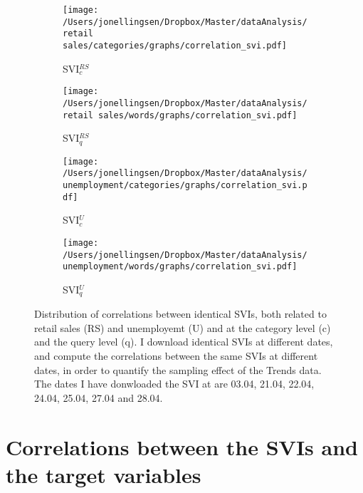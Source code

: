\begin{figure}[H]
\centering
    \begin{subfigure}[b]{0.45\textwidth}
\caption{SVI$_c^{RS}$}
        \texttt{[image: /Users/jonellingsen/Dropbox/Master/dataAnalysis/retail sales/categories/graphs/correlation\_svi.pdf]}
    \end{subfigure}
    \begin{subfigure}[b]{0.45\textwidth}
\caption{SVI$_q^{RS}$}
        \texttt{[image: /Users/jonellingsen/Dropbox/Master/dataAnalysis/retail sales/words/graphs/correlation\_svi.pdf]}
    \end{subfigure}
\begin{subfigure}[b]{0.45\textwidth}
 \caption{SVI$_c^U$}        
\texttt{[image: /Users/jonellingsen/Dropbox/Master/dataAnalysis/unemployment/categories/graphs/correlation\_svi.pdf]}
    \end{subfigure}
\begin{subfigure}[b]{0.45\textwidth}
\caption{SVI$_q^U$}        
\texttt{[image: /Users/jonellingsen/Dropbox/Master/dataAnalysis/unemployment/words/graphs/correlation\_svi.pdf]}
    \end{subfigure}
    \caption{Distribution of correlations between identical SVIs, both related to retail sales (RS) and unemployemt (U) and at the category level (c) and the query level (q). I download identical SVIs at different dates, and compute the correlations between the same SVIs at different dates, in order to quantify the sampling effect of the Trends data. The dates I have donwloaded the SVI at are 03.04, 21.04, 22.04, 24.04, 25.04, 27.04 and 28.04.}
	\label{fig:correlation_svi}
\end{figure}
\newpage
\section{Correlations between the SVIs and the target variables}\label{correlation_target}


